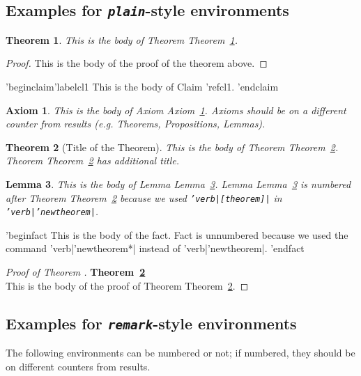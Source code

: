 \documentclass[qe,nameyear,draft]{econsocart}
\theoremstyle{plain}
\newtheorem{theorem}{Theorem}[section]
\newtheorem{lemma}[theorem]{Lemma}
\newtheorem{axiom}{Axiom}[section]
\begin{document}
\subsection{Examples for \textit{\texttt{plain}}-style environments}

\begin{theorem}\label{th1}This is the body of Theorem Theorem~\ref{th1}.

\end{theorem}\begin{proof}This is the body of the proof of the theorem above.

\end{proof}
'begin{claim}'label{cl1}
This is the body of Claim 'ref{cl1}.
'end{claim}
\begin{axiom}\label{ax1}This is the body of Axiom Axiom~\ref{ax1}. Axioms should be on a different counter from results (e.g. Theorems, Propositions, Lemmas).

\end{axiom}\begin{theorem}[Title of the Theorem]\label{th2}This is the body of Theorem Theorem~\ref{th2}. Theorem Theorem~\ref{th2} has additional title.

\end{theorem}\begin{lemma}\label{le1}This is the body of Lemma Lemma~\ref{le1}. Lemma Lemma~\ref{le1} is numbered after
Theorem Theorem~\ref{th2} because we used \texttt{'verb|[theorem]|} in \texttt{'verb|'newtheorem|}.

\end{lemma}
'begin{fact}
This is the body of the fact. Fact is unnumbered because we used the command 'verb|'newtheorem*|
instead of 'verb|'newtheorem|.
'end{fact}
\begin{proof}[Proof of Theorem ]\textbf{Theorem~\ref{th2}}\\
This is the body of the proof of Theorem Theorem~\ref{th2}.

\end{proof}\subsection{Examples for \textit{\texttt{remark}}-style environments}

The following environments can be numbered or not; if numbered, they should be on different counters from results.
\end{document}
